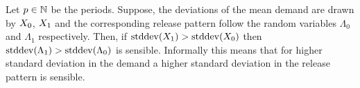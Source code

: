 \documentclass[mnsc]{informs3}
\newcommand\MS[2][r]{\ifx t#1 \textcolor{blue}{[\textbf{MS:} #2]}
  \else \begin{center}\textcolor{blue}{\textbf{MS:} #2} \end{center} \fi}
\begin{document}

\begin{lemma}




  Let $p \in \mathbb{N}$ be the periods. Suppose, the deviations of the mean demand are drawn by $X_{0}$,
  $X_{1}$ and the corresponding release pattern follow the random variables $\Lambda_{0}$ and
  $\Lambda_{1}$ respectively.
  Then, if $\mathrm{stddev}(X_{1}) > \mathrm{stddev}(X_{0})$  then $\mathrm{stddev}(\Lambda_{1}) > \mathrm{stddev}(\Lambda_{0})$
  is sensible.
  Informally this means that for higher standard deviation in the demand a higher standard deviation
  in the release pattern is sensible.



\end{lemma}
\end{document}
